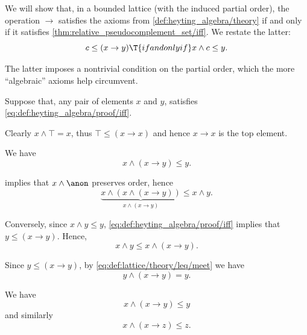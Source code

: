 \begin{defproof}
  We will show that, in a bounded lattice (with the induced partial order), the operation \( {\rightarrow} \) satisfies the axioms from \cref{def:heyting_algebra/theory} if and only if it satisfies \cref{thm:relative_pseudocomplement_set/iff}. We restate the latter:
  \begin{equation}\label{eq:def:heyting_algebra/proof/iff}
    c \leq (x \rightarrow y) \T{if and only if} x \wedge c \leq y.
  \end{equation}

  The latter imposes a nontrivial condition on the partial order, which the more \enquote{algebraic} axioms help circumvent.

   Suppose that, any pair of elements \( x \) and \( y \), satisfies \eqref{eq:def:heyting_algebra/proof/iff}.

   Clearly \( x \wedge \top = x \), thus \( \top \leq (x \rightarrow x) \) and hence \( x \rightarrow x \) is the top element.

   We have
  \begin{equation*}
    x \wedge (x \rightarrow y) \leq y.
  \end{equation*}

   implies that \( x \wedge \anon \) preserves order, hence
  \begin{equation*}
    \underbrace{x \wedge (x \wedge (x \rightarrow y))}_{x \wedge (x \rightarrow y)} \leq x \wedge y.
  \end{equation*}

  Conversely, since \( x \wedge y \leq y \), \eqref{eq:def:heyting_algebra/proof/iff} implies that \( y \leq (x \rightarrow y) \). Hence,
  \begin{equation*}
    x \wedge y \leq x \wedge (x \rightarrow y).
  \end{equation*}

   Since \( y \leq (x \rightarrow y) \), by \eqref{eq:def:lattice/theory/leq/meet} we have
  \begin{equation*}
    y \wedge (x \rightarrow y) = y.
  \end{equation*}

   We have
  \begin{equation*}
    x \wedge (x \rightarrow y) \leq y
  \end{equation*}
  and similarly
  \begin{equation*}
    x \wedge (x \rightarrow z) \leq z.
  \end{equation*}


\end{defproof}

